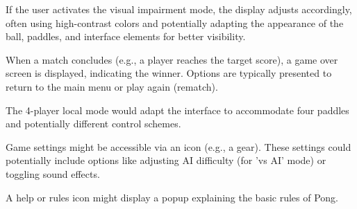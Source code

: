 \begin{figure}[H]
\end{figure}

If the user activates the visual impairment mode, the display adjusts accordingly, often using high-contrast colors and potentially adapting the appearance of the ball, paddles, and interface elements for better visibility.

\begin{figure}[H]
\end{figure}

When a match concludes (e.g., a player reaches the target score), a game over screen is displayed, indicating the winner. Options are typically presented to return to the main menu or play again (rematch).

\begin{figure}[H]
\end{figure}

The 4-player local mode would adapt the interface to accommodate four paddles and potentially different control schemes.

\begin{figure}[H]
\end{figure}

Game settings might be accessible via an icon (e.g., a gear). These settings could potentially include options like adjusting AI difficulty (for 'vs AI' mode) or toggling sound effects.

\begin{figure}[H]
\end{figure}

A help or rules icon might display a popup explaining the basic rules of Pong.

\begin{figure}[H]
\end{figure}

